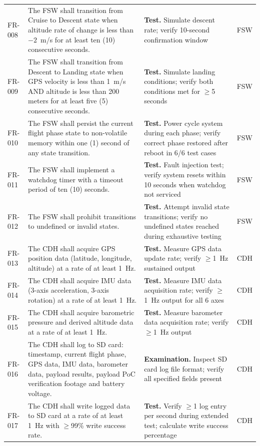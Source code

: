\begin{landscape}
\begin{longtable}{p{1.4cm}p{8.2cm}p{10.2cm}p{1.9cm}}
FR-008 & The FSW shall transition from Cruise to Descent state when altitude rate of change is less than $-2$~m/s for at least ten (10) consecutive seconds. & \textbf{Test.} Simulate descent rate; verify 10-second confirmation window & FSW \\
FR-009 & The FSW shall transition from Descent to Landing state when GPS velocity is less than 1~m/s AND altitude is less than 200 meters for at least five (5) consecutive seconds. & \textbf{Test.} Simulate landing conditions; verify both conditions met for $\geq$5 seconds & FSW \\
FR-010 & The FSW shall persist the current flight phase state to non-volatile memory within one (1) second of any state transition. & \textbf{Test.} Power cycle system during each phase; verify correct phase restored after reboot in 6/6 test cases & FSW \\
FR-011 & The FSW shall implement a watchdog timer with a timeout period of ten (10) seconds. & \textbf{Test.} Fault injection test; verify system resets within 10 seconds when watchdog not serviced & FSW \\
FR-012 & The FSW shall prohibit transitions to undefined or invalid states. & \textbf{Test.} Attempt invalid state transitions; verify no undefined states reached during exhaustive testing & FSW \\
FR-013 & The CDH shall acquire GPS position data (latitude, longitude, altitude) at a rate of at least 1~Hz. & \textbf{Test.} Measure GPS data update rate; verify $\geq$1~Hz sustained output & CDH \\
FR-014 & The CDH shall acquire IMU data (3-axis acceleration, 3-axis rotation) at a rate of at least 1~Hz. & \textbf{Test.} Measure IMU data acquisition rate; verify $\geq$1~Hz output for all 6 axes & CDH \\
FR-015 & The CDH shall acquire barometric pressure and derived altitude data at a rate of at least 1~Hz. & \textbf{Test.} Measure barometer data acquisition rate; verify $\geq$1~Hz output & CDH \\
FR-016 & The CDH shall log to SD card: timestamp, current flight phase, GPS data, IMU data, barometer data, payload results, payload PoC verification footage and battery voltage. & \textbf{Examination.} Inspect SD card log file format; verify all specified fields present & CDH \\
FR-017 & The CDH shall write logged data to SD card at a rate of at least 1~Hz with $\geq$99\% write success rate. & \textbf{Test.} Verify $\geq$1 log entry per second during extended test; calculate write success percentage & CDH \\

\end{longtable}
\end{landscape}
